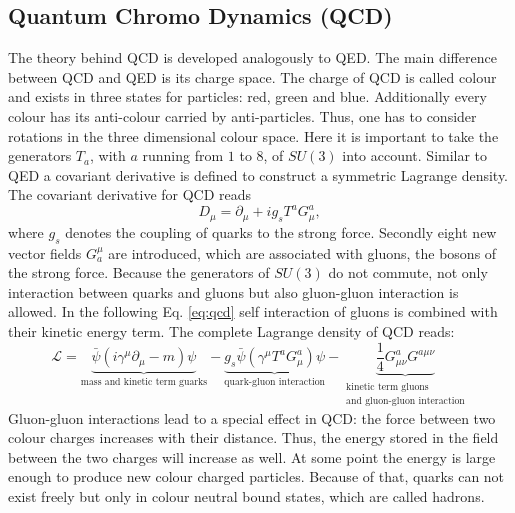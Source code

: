 	\subsection{Quantum Chromo Dynamics (QCD)}
	The theory behind QCD is developed analogously to QED. The main difference between QCD and QED is its charge space. The charge of QCD is called colour and exists in three states for particles: red, green and blue. Additionally every colour has its anti-colour carried by anti-particles. Thus, one has to consider rotations in the three dimensional colour space. Here it is important to take the generators $T_a$, with $a$ running from $1$ to $8$, of $SU(3)$ into account. Similar to QED a covariant derivative is defined to construct a symmetric Lagrange density. The covariant derivative for QCD reads
	\begin{equation}
	D_\mu = \partial_\mu + i g_s T^a G^a_{\mu},
	\end{equation}
	where $g_s$ denotes the coupling of quarks to the strong force. Secondly eight new vector fields $G_a^\mu$ are introduced, which are associated with gluons, the bosons of the strong force. Because the generators of $SU(3)$ do not commute, not only interaction between quarks and gluons but also gluon-gluon interaction is allowed. In the following Eq. \ref{eq:qcd} self interaction of gluons is combined with their kinetic energy term. The complete Lagrange density of QCD reads:
	\begin{equation}
	\mathcal{L} = \underbrace{\bar{\psi}(i \gamma^\mu \partial_\mu -m ) \psi}_{\text{mass and kinetic term guarks}} - \underbrace{g_s \bar{\psi}(\gamma^\mu T^a G^a_\mu) \psi}_{\text{quark-gluon interaction}} - \underbrace{\frac{1}{4} G^a_{\mu \nu}G^{a \mu \nu}}_{\substack{\text{kinetic term gluons} \\ \text{and gluon-gluon interaction}}}
	\label{eq:qcd}
	\end{equation}
	Gluon-gluon interactions lead to a special effect in QCD: the force between two colour charges increases with their distance. Thus, the energy stored in the field between the two charges will increase as well. At some point the energy is large enough to produce new colour charged particles. Because of that, quarks can not exist freely but only in colour neutral bound states, which are called hadrons.
